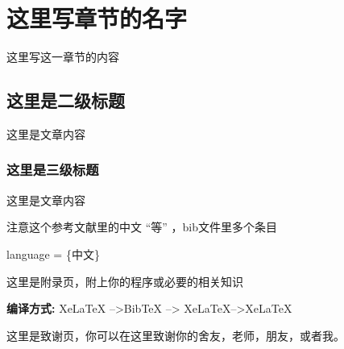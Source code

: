 \documentclass[AutoFakeBold]{LZUThesis}
\begin{document}
\chapter{这里写章节的名字}

这里写这一章节的内容

\section{这里是二级标题}
这里是文章内容\cite{tussyadiah2015hotels}

\subsection{这里是三级标题}
这里是文章内容\cite{partl2016}

注意这个参考文献里的中文 “等” \cite{partl2021}，bib文件里多个条目

language = \{中文\}



\backmatter


\printbib


\Appendix


这里是附录页，附上你的程序或必要的相关知识

{\bfseries 编译方式:} XeLaTeX -->BibTeX --> XeLaTeX-->XeLaTeX


\Thanks
这里是致谢页，你可以在这里致谢你的舍友，老师，朋友，或者我。


\Grade %
\end{document}
